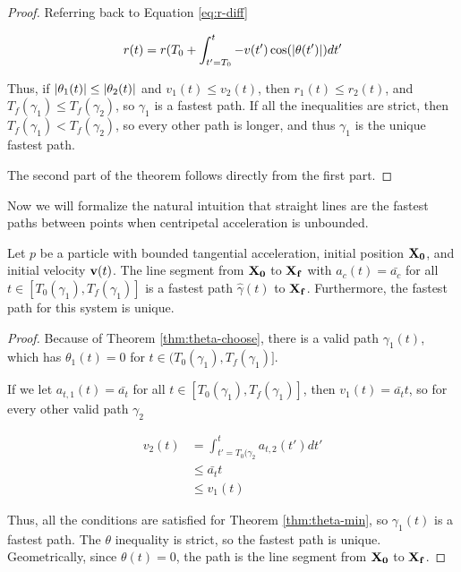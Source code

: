 \begin{proof}
  Referring back to Equation \ref{eq:r-diff}

  \[r(t) = r(T_0 + \int_{t' = T_0}^{t} - v(t') \cos(\abs{\theta(t')}) dt'\]

  Thus, if $\abs{\theta_1(t)} \le \abs{\theta_2(t)}$ and $v_1(t) \le v_2(t)$, then $r_1(t) \le r_2(t)$, and $T_f(\gamma_1) \le T_f(\gamma_2)$, so $\gamma_1$ is a fastest path. If all the inequalities are strict, then $T_f(\gamma_1) < T_f(\gamma_2)$, so every other path is longer, and thus $\gamma_1$ is the unique fastest path.

  The second part of the theorem follows directly from the first part.
\end{proof}

Now we will formalize the natural intuition that straight lines are the fastest paths between points when centripetal acceleration is unbounded.

\begin{theorem}\label{thm:line-proof}
  Let $p$ be a particle with bounded tangential acceleration, initial position $\mathbf{X_0}$, and initial velocity $\mathbf{v}(t)$. The line segment from $\mathbf{X_0}$ to $\mathbf{X_f}$ with $a_c(t) = \bar{a_c}$ for all $t \in [T_0(\gamma_1), T_f(\gamma_1)]$ is a fastest path $\hat{\gamma}(t)$ to $\mathbf{X_f}$. Furthermore, the fastest path for this system is unique.
\end{theorem}

\begin{proof}
  Because of Theorem \ref{thm:theta-choose}, there is a valid path $\gamma_1(t)$, which has $\theta_1(t) = 0$ for $t \in (T_0(\gamma_1), T_f(\gamma_1)]$.

  If we let $a_{t, 1}(t) = \bar{a_t}$ for all $t \in [T_0(\gamma_1), T_f(\gamma_1)]$, then $v_1(t) = \bar{a_t} t$, so for every other valid path $\gamma_2$

  \begin{align*}
    v_2(t)& = \int_{t'=T_0(\gamma_2}^{t} a_{t, 2}(t') dt'\\
    & \le \bar{a_t} t\\
    &  \le v_1(t)
  \end{align*}

  Thus, all the conditions are satisfied for Theorem \ref{thm:theta-min}, so $\gamma_1(t)$ is a fastest path. The $\theta$ inequality is strict, so the fastest path is unique. Geometrically, since $\theta(t) = 0$, the path is the line segment from $\mathbf{X_0}$ to $\mathbf{X_f}$.
\end{proof}

